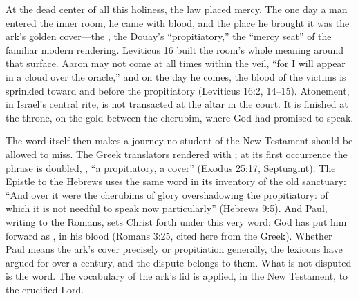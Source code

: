 At the dead center of all this holiness, the law placed mercy. The one
day a man entered the inner room, he came with blood, and the place he
brought it was the ark's golden cover---the , the
Douay's ``propitiatory,'' the ``mercy seat'' of the familiar modern
rendering. Leviticus 16 built the room's whole meaning around that
surface. Aaron may not come at all times within the veil, ``for I will
appear in a cloud over the oracle,'' and on the day he comes, the blood
of the victims is sprinkled toward and before the propitiatory
(Leviticus 16:2, 14--15).
Atonement, in Israel's central rite, is not transacted at the altar in
the court. It is finished at the throne, on the gold between the
cherubim, where God had promised to speak.

The word itself then makes a journey no student of the New Testament
should be allowed to miss. The Greek translators rendered
 with ; at its first occurrence the
phrase is doubled, , ``a propitiatory, a
cover'' (Exodus 25:17, Septuagint). The Epistle to the Hebrews
uses the same word in its inventory of the old sanctuary: ``And over it
were the cherubims of glory overshadowing the propitiatory: of which it
is not needful to speak now particularly'' (Hebrews 9:5). And Paul,
writing to the Romans, sets Christ forth under this very word: God has
put him forward as , in his blood (Romans 3:25,
cited here from the Greek). Whether Paul means the ark's cover
precisely or propitiation generally, the lexicons have argued for over
a century, and the dispute belongs to them. What is not disputed is the
word. The vocabulary of the ark's lid is applied, in the New
Testament, to the crucified Lord.

